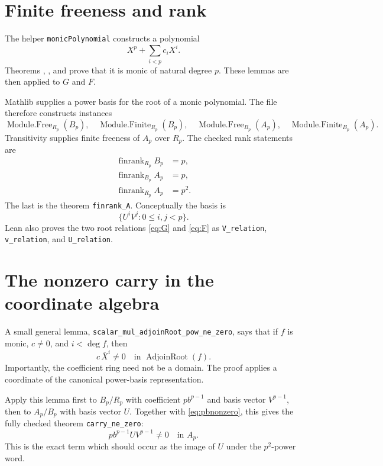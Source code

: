 \documentclass[11pt]{article}
\newcommand{\finrank}{\operatorname{finrank}}
\begin{document}
\section{Finite freeness and rank}

The helper \texttt{monicPolynomial} constructs a polynomial
\[
 X^p+\sum_{i<p}c_iX^i.
\]
Theorems ,
, and
 prove that it is monic of natural degree
$p$.  These lemmas are then applied to $G$ and $F$.

Mathlib supplies a power basis for the root of a monic polynomial.  The file
therefore constructs instances
\[
 \operatorname{Module.Free}_{R_p}(B_p),\quad
 \operatorname{Module.Finite}_{R_p}(B_p),\quad
 \operatorname{Module.Free}_{B_p}(A_p),\quad
 \operatorname{Module.Finite}_{B_p}(A_p).
\]
Transitivity supplies finite freeness of $A_p$ over $R_p$.  The checked rank
statements are
\begin{align*}
 \finrank_{R_p}B_p&=p,\\
 \finrank_{B_p}A_p&=p,\\
 \finrank_{R_p}A_p&=p^2.
\end{align*}
The last is the theorem \texttt{finrank\_A}.  Conceptually the basis is
\begin{equation}\label{eq:basis}
 \{U^iV^j:0\leq i,j<p\}.
\end{equation}
Lean also proves the two root relations \eqref{eq:G} and \eqref{eq:F} as
\texttt{V\_relation}, \texttt{v\_relation}, and
\texttt{U\_relation}.

\section{The nonzero carry in the coordinate algebra}

A small general lemma,
\texttt{scalar\_mul\_adjoinRoot\_pow\_ne\_zero}, says that if $f$ is monic,
$c\neq0$, and $i<\deg f$, then
\[
  c\,\overline X^i\neq0\quad\text{in }\operatorname{AdjoinRoot}(f).
\]
Importantly, the coefficient ring need not be a domain.  The proof applies a
coordinate of the canonical power-basis representation.

Apply this lemma first to $B_p/R_p$ with coefficient $pb^{p-1}$ and basis
vector $V^{p-1}$, then to $A_p/B_p$ with basis vector $U$.  Together with
\eqref{eq:pbnonzero}, this gives the fully checked theorem
\texttt{carry\_ne\_zero}:
\begin{equation}\label{eq:carry}
  p b^{p-1}U V^{p-1}\neq0\quad\text{in }A_p.
\end{equation}
This is the exact term which should occur as the image of $U$ under the
$p^2$-power word.
\end{document}
